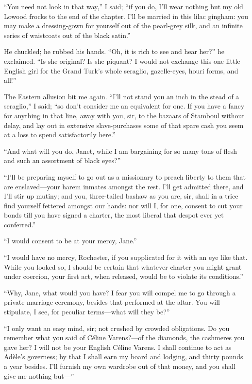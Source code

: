 \enquote{You need not look in that way,} I said; \enquote{if you do,
	I'll wear nothing but my old Lowood frocks to the end of the chapter.
	I'll be married in this lilac gingham: you may make a dressing-gown for
	yourself out of the pearl-grey silk, and an infinite series of
	waistcoats out of the black satin.}

He chuckled; he rubbed his hands.  \enquote{Oh, it is rich to see and
	hear her?} he exclaimed.  \enquote{Is she original?  Is she piquant?  I
	would not exchange this one little English girl for the Grand Turk's
	whole seraglio, gazelle-eyes, houri forms, and all!}

The Eastern allusion bit me again.  \enquote{I'll not stand you an inch
	in the stead of a seraglio,} I said; \enquote{so don't consider me an
	equivalent for one.  If you have a fancy for anything in that line, away
	with you, sir, to the bazaars of Stamboul without delay, and lay out in
	extensive slave-purchases some of that spare cash you seem at a loss to
	spend satisfactorily here.}

\enquote{And what will you do, Janet, while I am bargaining for so many
	tons of flesh and such an assortment of black eyes?}

\enquote{I'll be preparing myself to go out as a missionary to preach
	liberty to them that are enslaved---your harem inmates amongst the
	rest.  I'll get admitted there, and I'll stir up mutiny; and you,
	three-tailed bashaw as you are, sir, shall in a trice find yourself
	fettered amongst our hands: nor will I, for one, consent to cut your
	bonds till you have signed a charter, the most liberal that despot ever
	yet conferred.}

\enquote{I would consent to be at your mercy, Jane.}

\enquote{I would have no mercy, \Mr{} Rochester, if you supplicated for it
	with an eye like that.  While you looked so, I should be certain that
	whatever charter you might grant under coercion, your first act, when
	released, would be to violate its conditions.}

\enquote{Why, Jane, what would you have?  I fear you will compel me to
	go through a private marriage ceremony, besides that performed at the
	altar.  You will stipulate, I see, for peculiar terms---what will they
	be?}

\enquote{I only want an easy mind, sir; not crushed by crowded
	obligations.  Do you remember what you said of Céline Varens?---of the
	diamonds, the cashmeres you gave her?  I will not be your English Céline
	Varens.  I shall continue to act as Adèle's governess; by that I shall
	earn my board and lodging, and thirty pounds a year besides.  I'll
	furnish my own wardrobe out of that money, and you shall give me nothing
	but---}

